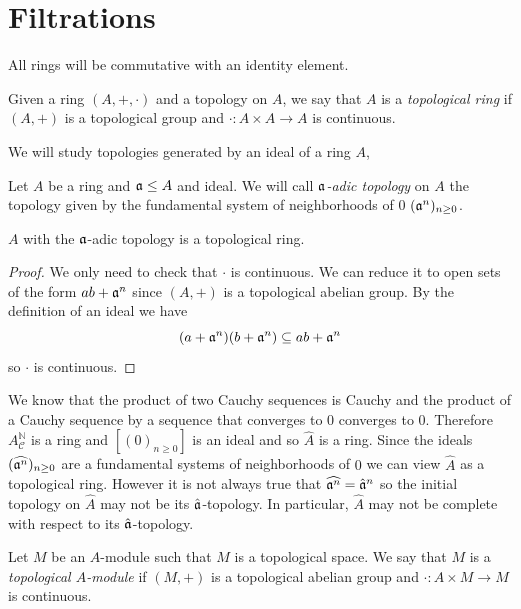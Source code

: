 \section{Filtrations}
All rings will be commutative with an identity element. 
\begin{defi}
    Given a ring $(A,+,\cdot)$ and a topology on $A$, we say that $A$ is a \emph{topological ring} if $(A,+)$ is a topological group and $\cdot\colon A\times A\to A$ is continuous.
\end{defi}

We will study topologies generated by an ideal of a ring $A$,

\begin{defi}
    Let $A$ be a ring and $\mathfrak{a}\leq A$ and ideal. We will call \emph{$\mathfrak{a}$-adic topology} on $A$ the topology given by the fundamental system of neighborhoods of $0$ $(\mathfrak{a}^n)_{n\geq 0}$.
\end{defi}

\begin{prop}
    $A$ with the $\mathfrak{a}$-adic topology is a topological ring.
\end{prop}
\begin{proof}
    We only need to check that $\cdot$ is continuous. We can reduce it to open sets of the form $ab+\mathfrak{a}^n$ since $(A,+)$ is a topological abelian group. By the definition of an ideal we have 
    \[
    (a+\mathfrak{a}^n)(b+\mathfrak{a}^n)\subseteq ab+\mathfrak{a}^n
    \]
    so $\cdot$ is continuous.
\end{proof}
 
We know that the product of two Cauchy sequences is Cauchy and the product of a Cauchy sequence by a sequence that converges to $0$ converges to $0$. Therefore $A^\mathbb N_\mathcal C$ is a ring and $[(0)_{n\geq 0}]$ is an ideal and so $\hat A$ is a ring. Since the ideals $(\widehat{\mathfrak{a}^n})_{n\geq 0}$ are a fundamental systems of neighborhoods of $0$ we can view $\hat A$ as a topological ring. However it is not always true that $\widehat{\mathfrak{a}^n}=\hat{\mathfrak{a}}^n$ so the initial topology on $\hat A$ may not be its $\hat{\mathfrak{a}}$-topology. In particular, $\hat A$ may not be complete with respect to its $\hat{\mathfrak{a}}$-topology. 

\begin{defi}
    Let $M$ be an $A$-module such that $M$ is a topological space. We say that $M$ is a \emph{topological $A$-module} if $(M,+)$ is a topological abelian group and $\cdot\colon A\times M\to M$ is continuous.
\end{defi}

